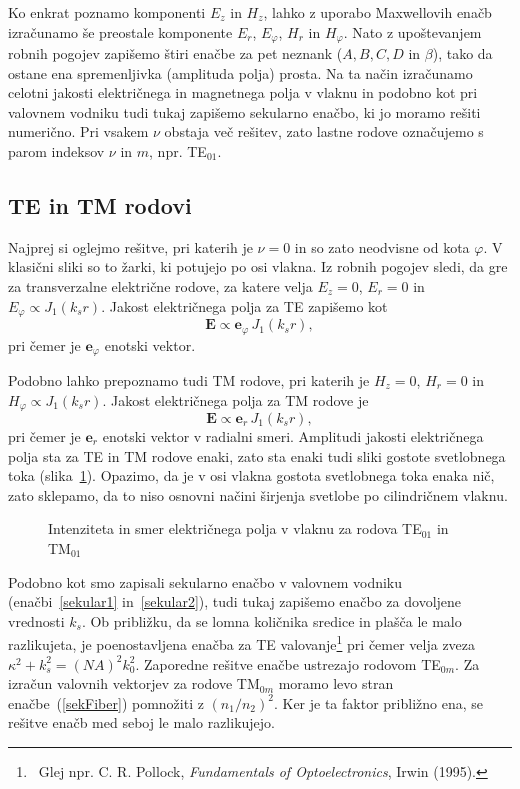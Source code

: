 Ko enkrat poznamo komponenti $E_z$ in $H_z$, lahko z uporabo Maxwellovih enačb izračunamo še 
preostale komponente $E_r$, $E_\varphi$, $H_r$ in $H_\varphi$. 
Nato z upoštevanjem robnih pogojev zapišemo štiri enačbe za 
pet neznank ($A,B,C,D$ in $\beta$),
tako da ostane ena spremenljivka (amplituda polja) prosta. Na ta način izračunamo celotni 
jakosti električnega in magnetnega polja v vlaknu in podobno kot pri valovnem vodniku 
tudi tukaj zapišemo sekularno enačbo, ki jo moramo rešiti numerično. Pri vsakem $\nu$ obstaja 
več rešitev, zato lastne rodove označujemo s parom indeksov $\nu$ in $m$, npr. TE$_{01}$.

\subsection*{TE in TM rodovi}
Najprej si oglejmo rešitve, pri katerih je $\nu=0$ in so zato neodvisne od kota $\varphi$. 
V klasični sliki so to žarki, ki potujejo po osi vlakna. Iz robnih pogojev sledi, da 
gre za transverzalne električne rodove, za katere velja $E_z=0$, $E_r=0$ in $E_\varphi \propto J_1(k_sr)$.
Jakost električnega polja za TE zapišemo kot 
\begin{equation}
\mathbf{E} \propto \mathbf{e}_\varphi \, J_1(k_s r),
\end{equation}
pri čemer je $\mathbf{e}_\varphi$ enotski vektor.

Podobno lahko prepoznamo tudi TM rodove, pri katerih je $H_z=0$, $H_r=0$ in $H_\varphi \propto J_1(k_sr)$.
Jakost električnega polja za TM rodove je
\begin{equation}
\mathbf{E} \propto \mathbf{e}_r \, J_1(k_s r),
\end{equation}
pri čemer je $\mathbf{e}_r$ enotski vektor v radialni smeri. 
Amplitudi jakosti električnega polja sta za TE in TM rodove enaki, zato
sta enaki tudi sliki gostote svetlobnega toka (slika~\ref{fig:TE01}). Opazimo, da je v osi
vlakna gostota svetlobnega toka enaka nič, zato sklepamo, da to niso osnovni načini 
širjenja svetlobe po cilindričnem vlaknu. 
\begin{figure}[ht]
\centering
\def\svgwidth{90truemm} 

\caption{Intenziteta in smer električnega polja v vlaknu za rodova TE$_{01}$ in TM$_{01}$
}
\label{fig:TE01}
\end{figure}
Podobno kot smo zapisali sekularno enačbo v valovnem vodniku (enačbi~\ref{sekular1}
in~\ref{sekular2}), tudi tukaj zapišemo enačbo za dovoljene vrednosti $k_s$. 
Ob približku, da se lomna količnika
sredice in plašča le malo razlikujeta, je poenostavljena enačba za TE 
valovanje\footnote{~Glej npr. C. R. Pollock, {\it Fundamentals of Optoelectronics}, Irwin (1995).}
pri čemer velja zveza $\kappa^2+k_s^2=(NA)^2k_0^2$. Zaporedne rešitve enačbe ustrezajo rodovom TE$_{0m}$. 
Za izračun valovnih vektorjev za rodove TM$_{0m}$ moramo levo stran enačbe~(\ref{sekFiber}) pomnožiti z $(n_1/n_2)^2$. Ker je ta faktor približno ena, se rešitve enačb med seboj le malo razlikujejo.

